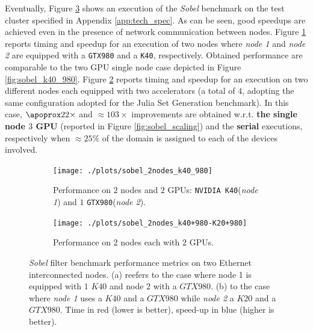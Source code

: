 Eventually, Figure \ref{fig:sobel_2nodes_performance} shows an execution of the \textit{Sobel} benchmark on the test cluster specified in Appendix \ref{app:tech_spec}. As can be seen, good speedups are achieved even in the presence of network communication between nodes. Figure \ref{fig:sobel_2nodes_k40_980} reports timing and speedup for an execution of two nodes where \textit{node 1} and \textit{node 2} are equipped with a \texttt{GTX980} and a \texttt{K40}, respectively. Obtained performance are comparable to the two GPU single node case depicted in Figure \ref{fig:sobel_k40_980}.
Figure \ref{fig:sobel_2nodes_k40+980-K20+980} reports timing and speedup for an execution on two different nodes each equipped with two accelerators  (a total of $4$, adopting the same configuration adopted for the Julia Set Generation benchmark). In this case, $\apoprox 22 \times$ and $\approx 103 \times$ improvements are obtained w.r.t. \textbf{the single node $3$ GPU} (reported in Figure \ref{fig:sobel_scaling}) and the \textbf{serial} executions, respectively when $\approx 25\%$ of the domain is assigned to each of the devices involved.
\begin{figure}[!htb]
	\begin{subfigure}{1.0\textwidth}
		\caption{Performance on $2$ nodes and $2$ GPUs: \texttt{NVIDIA K40}(\textit{node 1}) and $1$ \texttt{GTX980}(\textit{node 2}).}
		\label{fig:sobel_2nodes_k40_980}
		\texttt{[image: ./plots/sobel\_2nodes\_k40\_980]}
		
	\end{subfigure}        
	\endminipage \hfill
	\vspace{5mm}
	\begin{subfigure}{1.0\textwidth}
		\texttt{[image: ./plots/sobel\_2nodes\_k40+980-K20+980]}
		\caption{Performance on $2$ nodes each with $2$ GPUs.}
		\label{fig:sobel_2nodes_k40+980-K20+980}
	\end{subfigure}
	\endminipage\hfill
	\caption[\textit{Sobel} filter benchmark performance metrics on two nodes.]{\textit{Sobel} filter benchmark performance metrics on two Ethernet interconnected nodes. (a) reefers to the case where node 1 is equipped with $1$ $K40$ and node 2 with a $GTX980$. (b) to the case where \textit{node 1} uses a $K40$ and a $GTX980$ while \textit{node 2} a $K20$ and a $GTX980$. Time in red (lower is better), speed-up in blue (higher is better).}
	\label{fig:sobel_2nodes_performance}
\end{figure}
